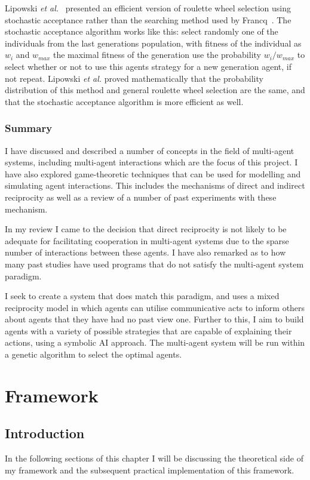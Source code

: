 \documentclass[]{final_report}
\begin{document}
Lipowski \textit{et al.}~\cite{lipowski2012roulette} presented an efficient version of roulette wheel selection using stochastic acceptance rather than the searching method used by Francq~\cite{genetic_algorithms}. The stochastic acceptance algorithm works like this: select randomly one of the individuals from the last generations population, with fitness of the individual as $w_i$ and $w_{max}$ the maximal fitness of the generation use the probability $w_i / w_{max}$ to select whether or not to use this agents strategy for a new generation agent, if not repeat. Lipowski \textit{et al.} proved mathematically that the probability distribution of this method and general roulette wheel selection are the same, and that the stochastic acceptance algorithm is more efficient as well.

\subsection{Summary}
I have discussed and described a number of concepts in the field of multi-agent systems, including multi-agent interactions which are the focus of this project. I have also explored game-theoretic techniques that can be used for modelling and simulating agent interactions. This includes the mechanisms of direct and indirect reciprocity as well as a review of a number of past experiments with these mechanism.\par 
In my review I came to the decision that direct reciprocity is not likely to be adequate for facilitating cooperation in multi-agent systems due to the sparse number of interactions between these agents. I have also remarked as to how many past studies have used programs that do not satisfy the multi-agent system paradigm.\par 
I seek to create a system that does match this paradigm, and uses a mixed reciprocity model in which agents can utilise communicative acts to inform others about agents that they have had no past view one. Further to this, I aim to build agents with a variety of possible strategies that are capable of explaining their actions, using a symbolic AI approach. The multi-agent system will be run within a genetic algorithm to select the optimal agents.

\chapter{Framework}

\section{Introduction}
In the following sections of this chapter I will be discussing the theoretical side of my framework and the subsequent practical implementation of this framework.
\end{document}

